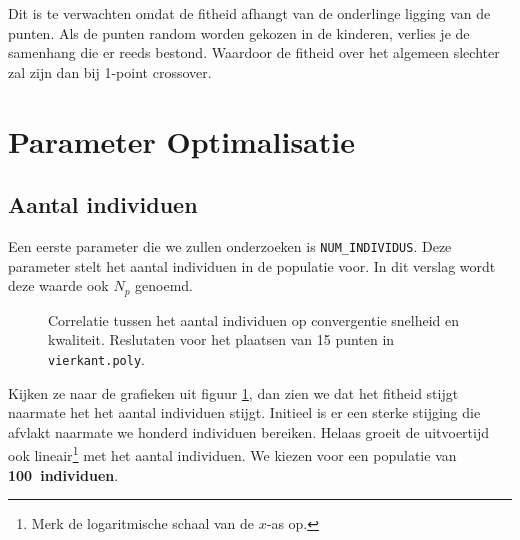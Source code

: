 Dit is te verwachten omdat de fitheid afhangt van de onderlinge ligging van de punten. Als de punten random worden gekozen in de kinderen, verlies je de samenhang die er reeds bestond. Waardoor de fitheid over het algemeen slechter zal zijn dan bij 1-point crossover.

\section{Parameter Optimalisatie}
\subsection{Aantal individuen}
Een eerste parameter die we zullen onderzoeken is \texttt{NUM\_INDIVIDUS}. Deze parameter stelt het aantal individuen in de populatie voor. In dit verslag wordt deze waarde ook $N_p$ genoemd.
\begin{figure}[H]



  \caption{Correlatie tussen het aantal individuen op convergentie snelheid en kwaliteit. Reslutaten voor het plaatsen van 15 punten in \texttt{vierkant.poly}.}
  \label{graf:numIndividus}
\end{figure}
Kijken ze naar de grafieken uit figuur \ref{graf:numIndividus}, dan zien we dat het fitheid stijgt naarmate het het aantal individuen stijgt. Initieel is er een sterke stijging die afvlakt naarmate we honderd individuen bereiken. Helaas groeit de uitvoertijd ook lineair\footnote{Merk de logaritmische schaal van de $x$-as op.} met het aantal individuen. We kiezen voor een populatie van \textbf{100~individuen}. 
%
%
%
%
%
